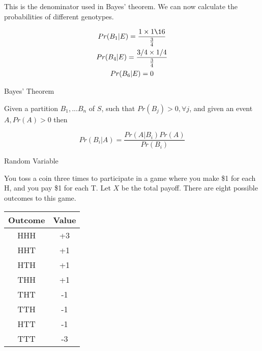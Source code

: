 \documentclass{report}
\begin{document}
\begin{description}
\begin{mdframed}
           This is the denominator used in Bayes' theorem.
           We can now calculate the probabilities of 
           different genotypes.

           \begin{gather}
               Pr(B_1|E) = \frac{1 \times 1\16}{\frac{3}{4}}\\
               Pr(B_4|E) = \frac{3/4 \times 1/4}{\frac{3}{4}}\\
               Pr(B_6|E) = 0
           \end{gather}
       \end{mdframed}
   \item {\large Bayes' Theorem}
       \begin{mdframed}
           Given a partition $B_1, ... B_n$ of $S$, such that
            $Pr(B_j) > 0, \forall j$, and given an event
             $A, Pr(A) > 0$ then

             \begin{displaymath}
                 Pr(B_i|A) = \frac{Pr(A|B_i)Pr(A)}{Pr(B_i)}
             \end{displaymath}
       \end{mdframed}
       \pagebreak
    \item {\large Random Variable}
        \begin{mdframed}
            You toss a coin three times to participate
            in a game where you make \$1 for each H, and
            you pay \$1 for each T. Let $X$ be the total
            payoff. There are eight possible outcomes to
            this game.

            \begin{center}
                \begin{tabular}{| c | c |}
                    \hline
                    Outcome & Value\\
                    \hline
                    HHH & +3\\ 
                    \hline
                    HHT & +1\\
                    \hline
                    HTH & +1\\
                    \hline
                    THH & +1\\
                    \hline
                    THT & -1\\
                    \hline
                    TTH & -1\\
                    \hline
                    HTT & -1\\
                    \hline
                    TTT & -3\\
                    \hline
                \end{tabular}
            \end{center}


\end{mdframed}
\end{description}
\end{document}
